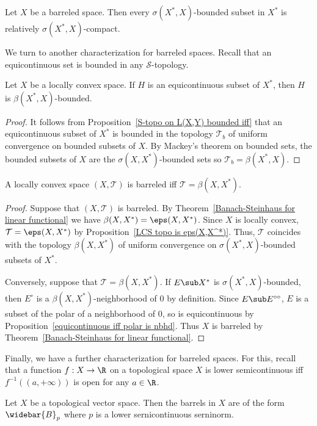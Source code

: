 \begin{corollary}
Let $X$ be a barreled space. Then every $\sigma(X^*,X)$-bounded subset in $X^*$ is relatively $\sigma(X^*,X)$-compact.
\end{corollary}
We turn to another characterization for barreled spaces. Recall that an equicontinuous set is bounded in any $\mathcal{S}$-topology.
\begin{proposition}\label{LCHS equicontinuous is strongly bounded}
Let $X$ be a locally convex space. If $H$ is an equicontinuous subset of $X^*$, then $H$ is $\beta(X^*,X)$-bounded.
\end{proposition}
\begin{proof}
It follows from Proposition~\ref{S-topo on L(X,Y) bounded iff} that an equicontinuous subset of $X^*$ is bounded in the topology $\mathcal{T}_b$ of uniform convergence on bounded subsets of $X$. By Mackey's theorem on bounded sets, the bounded subsets of $X$ are the $\sigma(X,X^*)$-bounded sets so $\mathcal{T}_b=\beta(X^*,X)$.
\end{proof}
\begin{theorem}\label{LCS barreled iff carry strong topology}
A locally convex space $(X,\mathcal{T})$ is barreled iff $\mathcal{T}=\beta(X,X^*)$.
\end{theorem}
\begin{proof}
Suppose that $(X,\mathcal{T})$ is barreled. By Theorem~\ref{Banach-Steinhaus for linear functional} we have $\beta(X,X^*)=\eps(X,X^*)$. Since $X$ is locally convex, $\mathcal{T}=\eps(X,X^*)$ by Proposition~\ref{LCS topo is eps(X,X^*)}. Thus, $\mathcal{T}$ coincides with the topology $\beta(X,X^*)$ of uniform convergence on $\sigma(X^*,X)$-bounded subsets of $X^*$.\par
Conversely, suppose that $\mathcal{T}=\beta(X,X^*)$. If $E\sub X^*$ is $\sigma(X^*,X)$-bounded, then $E^\circ$ is a $\beta(X,X^*)$-neighborhood of $0$ by definition. Since $E\sub E^{\circ\circ}$, $E$ is a subset of the polar of a neighborhood of $0$, so is equicontinuous by Proposition~\ref{equicontinuous iff polar is nbhd}. Thus $X$ is barreled by Theorem~\ref{Banach-Steinhaus for linear functional}.
\end{proof}
Finally, we have a further characterization for barreled spaces. For this, recall that a function $f:X\to\R$ on a topological space $X$ is lower semicontinuous iff $f^{-1}((a,+\infty))$ is open for any $a\in\R$.
\begin{proposition}\label{TVS barrel is closed ball of lsc seminorm}
Let $X$ be a topological vector space. Then the barrels in $X$ are of the form $\widebar{B}_p$ where $p$ is a lower sernicontinuous serninorm.
\end{proposition}
